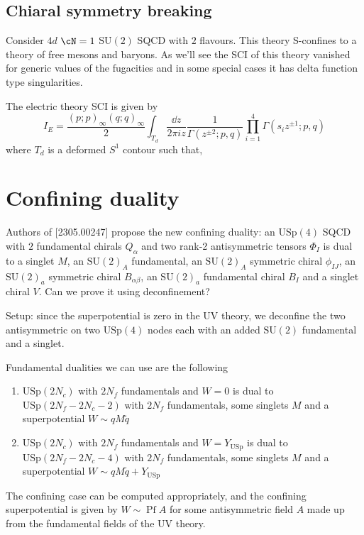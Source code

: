 \documentclass[11pt]{article}
\theoremstyle{definition}
\numberwithin{equation}{section}
\newcommand*\SU{\mathrm{SU}}
\newcommand*\USp{\mathrm{USp}}
\begin{document}
\subsection{Chiaral symmetry breaking}
Consider $4d$ $\cN=1$ $\SU(2)$ SQCD with $2$ flavours. This theory S-confines to a theory of free mesons and baryons. As we'll see the SCI of this theory vanished for generic values of the fugacities and in some special cases it has delta function type singularities.

The electric theory SCI is given by
\begin{equation}
	I_{E}=\frac{(p;p)_{\infty}(q;q)_{\infty}}{2}\int_{T_{d}}\frac{\dd{z}}{2\pi i z}\frac{1}{\Gamma(z^{\pm2};p,q)}\prod_{i=1}^{4}\Gamma( s_{i}z^{\pm 1};p,q)
\end{equation}
where $T_{d}$ is a deformed $S^{1}$ contour such that, 

\section{Confining duality}
Authors of [2305.00247] propose the new confining duality: an $\USp(4)$ SQCD with $2$ fundamental chirals $Q_{\alpha}$ and two rank-2 antisymmetric tensors $\Phi_{I}$ is dual to a singlet $M$, an $\SU(2)_{A}$ fundamental, an $\SU(2)_{A}$ symmetric chiral $\phi_{IJ}$, an $\SU(2)_{a}$ symmetric chiral $B_{\alpha\beta}$, an $\SU(2)_{a}$ fundamental chiral $B_{I}$ and a singlet chiral $V$. Can we prove it using deconfinement?

Setup: since the superpotential is zero in the UV theory, we deconfine the two antisymmetric on two $\USp(4)$ nodes each with an added $\SU(2)$ fundamental and a singlet. 

Fundamental dualities we can use are the following
\begin{enumerate}
	\item $\USp(2N_{c})$ with $2N_{f}$ fundamentals and $W=0$ is dual to $\USp(2N_{f}-2N_{c}-2)$ with $2N_{f}$ fundamentals, some singlets $M$ and a superpotential $W\sim qM\tilde{q}$
	\item$\USp(2N_{c})$ with $2N_{f}$ fundamentals and $W=Y_{\USp}$ is dual to $\USp(2N_{f}-2N_{c}-4)$ with $2N_{f}$ fundamentals, some singlets $M$ and a superpotential $W\sim qM\tilde{q}+Y_{\USp}$
\end{enumerate}

The confining case can be computed appropriately, and the confining superpotential is given by $W\sim \operatorname{Pf} A$ for some antisymmetric field $A$ made up from the fundamental fields of the UV theory.



{}

\end{document}
